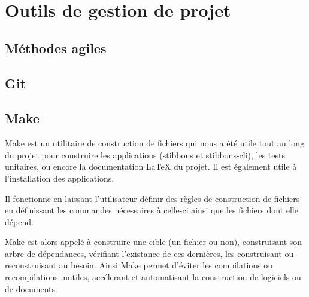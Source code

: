 \section{Outils de gestion de projet}

\subsection{Méthodes agiles}



\subsection{Git}


\subsection{Make}

Make est un utilitaire de construction de fichiers qui nous a été utile tout au long du projet pour construire les applications (stibbons et stibbons-cli), les tests unitaires, ou encore la documentation \LaTeX{} du projet. Il est également utile à l'installation des applications.

Il fonctionne en laissant l'utilisateur définir des règles de construction de fichiers en définissant les commandes nécessaires à celle-ci ainsi que les fichiers dont elle dépend.

Make est alors appelé à construire une cible (un fichier ou non), construisant son arbre de dépendances, vérifiant l'existance de ces dernières, les construisant ou reconstruisant au besoin. Ainsi Make permet d'éviter les compilations ou recompilations inutiles, accélerant et automatisant la construction de logiciels ou de documents.
